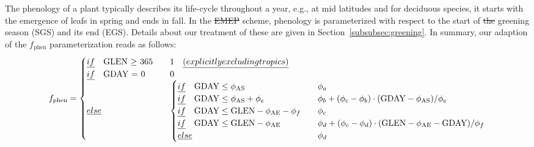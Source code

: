 \documentclass[gmd, manuscript]{copernicus}
\providecommand{\DIFadd}[1]{{\protect\color{blue}\uwave{#1}}} %
\providecommand{\DIFdel}[1]{{\protect\color{red}\sout{#1}}}                      %
\providecommand{\DIFaddbegin}{} %
\providecommand{\DIFaddend}{} %
\providecommand{\DIFdelbegin}{} %
\providecommand{\DIFdelend}{} %
\begin{document}
The phenology of a plant typically describes its life-cycle throughout a year, e.g., at mid latitudes and for deciduous species, it starts with the emergence of leafs in spring and ends in fall. In the \DIFdelbegin \DIFdel{EMEP }\DIFdelend \DIFaddbegin \DIFadd{mOSaic }\DIFaddend scheme, phenology is parameterized with respect to the start of \DIFdelbegin \DIFdel{the }\DIFdelend greening season (SGS) and its end (EGS). Details about our treatment of these are given in Section~\ref{subsubsec:greening}. In summary, our adaption of the $f_\text{phen}$ parameterization reads as follows:
%
\begin{equation}
  f_\text{phen} =
  \DIFdelbegin %
\DIFdelend \DIFaddbegin \begin{cases}
    \emph{if} \quad \text{GLEN $\ge$ 365} & \quad 1 \quad \emph{(explicitly excluding tropics)} \\
    \emph{if} \quad \text{GDAY = 0}  & \quad 0 \\
    \emph{else}  & \quad 
    \begin{cases}
      \emph{if} \quad \text{GDAY} \le \phi_\text{AS}  & \quad \phi_a \\
      \emph{if} \quad \text{GDAY} \le \phi_\text{AS} + \phi_e  & \quad \phi_b+(\phi_c-\phi_b)\cdot(\text{GDAY}-\phi_\text{AS})/\phi_e\\
      \emph{if} \quad \text{GDAY} \le \text{GLEN} - \phi_\text{AE} - \phi_f  & \quad \phi_c\\
      \emph{if} \quad \text{GDAY} \le \text{GLEN} - \phi_\text{AE}  & \quad \phi_d+(\phi_c-\phi_d)\cdot(\text{GLEN}-\phi_\text{AE}-\text{GDAY})/\phi_f\\
      \emph{else} & \quad \phi_d
    \end{cases}
  \DIFaddend \end{cases}
  \label{eq:fphen}
\end{equation}
\end{document}
